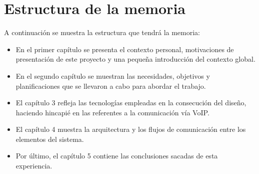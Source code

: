 \documentclass[a4paper, 12pt]{book}
\begin{document}
\section{Estructura de la memoria}

A continuación se muestra la estructura que tendrá la memoria:
\begin{itemize}
  \item En el primer capítulo se presenta el contexto personal, motivaciones de presentación de este proyecto y una pequeña introducción del contexto global.
  
  \item  En el segundo capítulo se muestran las necesidades, objetivos y planificaciones que se llevaron a cabo para abordar el trabajo.  

  \item El capítulo 3 refleja las tecnologías empleadas en la consecución del diseño, haciendo hincapié en las referentes a la comunicación vía VoIP.
  
  \item El capítulo 4 muestra la arquitectura y los flujos de comunicación entre los elementos del sistema.  

  \item Por último, el capítulo 5 contiene las conclusiones sacadas de esta experiencia.
\end{itemize}




\end{document}
